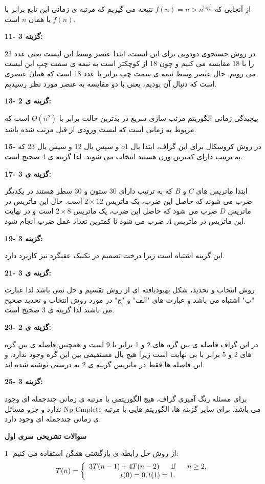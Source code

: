 \documentclass[12pt,fleqn,a4paper]{article}
\begin{document}
از آنجایی که $f(n)=n>n^{\log_4^3}$ نتیجه می گیریم که مرتبه ی زمانی این تابع برابر با $f(n)$ یا همان $n$ است.

{\bf 11- گزینه 3:}

در روش جستجوی دودویی برای این لیست، ابتدا عنصر وسط این لیست یعنی عدد 23 را با 18 مقایسه می کنیم و چون 18 از کوچکتر است به نیمه ی سمت چپ این لیست می رویم. حال عنصر وسط نیمه ی سمت چپ برابر با عدد 18 است که همان عنصری است که دنبال آن بودیم، یعنی با دو مقایسه به عنصر مورد نظر رسیدیم.

{\bf 13- گزینه ی 2:}

پیچیدگی زمانی الگوریتم مرتب سازی سریع در بدترین حالت برابر با $\Theta(n^2)$ است که مربوط به زمانی است که لیست ورودی از قبل مرتب شده باشد.

{\bf 15-}
در روش کروسکال برای این گراف، ابتدا یال $o1$ و سپس یال 12 و سپس یال 23 که به ترتیب دارای کمترین وزن هستند انتخاب می شوند. لذا گزینه ی 4 صحیح است.

{\bf 17- گزینه ی 3:}

ابتدا ماتریس های $C$ و $B$ که به ترتیب دارای 30 ستون و 30 سطر هستند در یکدیگر ضرب می شوند که حاصل این ضرب، یک ماتریس
$2\times12$
 است. حال این ماتریس در ماتریس $D$ ضرب می شود که حاصل این ضرب، یک ماتریس $2\times8$ است و در نهایت این ماتریس در ماتریس $A$ ضرب می شود تا کمترین تعداد عمل ضرب انجام شود.

{\bf 19- گزینه 3:}

این گزینه اشتباه است زیرا درخت تصمیم در تکنیک عقبگرد نیز کاربرد دارد.

{\bf 21- گزینه ی 3:}

روش انتخاب و تحدید، شکل بهبودیافته ای از روش تقسیم و حل نمی باشد لذا عبارت "ب" اشتباه می باشد و عبارت های "الف" و "ج" در مورد روش انتخاب و تحدید صحیح می باشند لذا گزینه ی 3 صحیح است.

{\bf 23- گزینه ی 2:}

در این گراف فاصله ی بین گره های 2 و 1 برابر با 9 است و همچنین فاصله ی بین گره های 2 و 5 برابر با بی نهایت است زیرا هیچ یال مستقیمی بین این گره وجود ندارد. و این فاصله ها فقط در ماتریس گزینه ی 2 به درستی نوشته شده اند.

{\bf 25- گزینه 3:}

برای مسئله رنگ آمیزی گراف، هیچ الگوریتمی با مرتبه ی زمانی چندجمله ای وجود ندارد و جزو مسائل  Np-Cmplete می باشد. برای سایر گزینه ها، الگوریتم هایی با مرتبه ی زمانی چندجمله ای وجود دارد.

\vspace{2cm}
\begin{center}

{\bf سوالات تشریحی سری اول}
\end{center}
1- از روش حل رابطه ی بازگشتی همگن استفاده می کنیم:
\begin{equation*}
T(n)=
\left\lbrace\begin{array}{c l}3T(n-1)+4T(n-2) ~~~~~\mbox{if}~~~~~ n\geq2,\\t(0)=0, t(1)=1.\end{array}\right.
\end{equation*}
\end{document}
